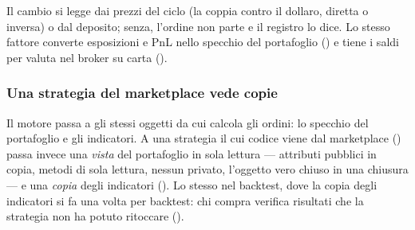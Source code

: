 \noindent
Il cambio si legge dai prezzi del ciclo (la coppia contro il dollaro, diretta
o inversa) o dal deposito; senza, l'ordine non parte e il registro lo dice.
Lo stesso fattore converte esposizioni e PnL nello specchio del portafoglio
() e tiene i saldi per valuta nel broker su carta
().

\subsubsection{Una strategia del marketplace vede copie}

Il motore passa a  gli stessi oggetti da cui calcola
gli ordini: lo specchio del portafoglio e gli indicatori. A una strategia il
cui codice viene dal marketplace () passa invece
una \emph{vista} del portafoglio in sola lettura --- attributi pubblici in
copia, metodi di sola lettura, nessun privato, l'oggetto vero chiuso in una
chiusura --- e una \emph{copia} degli indicatori
(). Lo stesso nel backtest, dove la copia
degli indicatori si fa una volta per backtest: chi compra verifica risultati
che la strategia non ha potuto ritoccare ().

